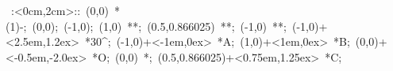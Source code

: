 %


\hbox{
\xy    <2cm,0cm>:<0cm,2cm>::
       (0,0) *\ellipse(1){-}; (0,0); 
       (-1,0); (1,0) **\dir{-};  
       (0.5,0.866025) **\dir{-}; (-1,0) **\dir{-};
       (-1,0)+<2.5em,1.2ex> *{30^\circ};
       (-1,0)+<-1em,0ex> *{A};
       (1,0)+<1em,0ex> *{B};
       (0,0)+<-0.5em,-2.0ex> *{O};
       (0,0) *{\bullet};
       (0.5,0.866025)+<0.75em,1.25ex> *{C};
\endxy}

